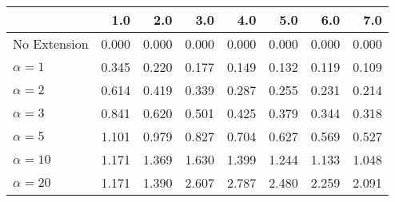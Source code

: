 \begin{tabular}{lrrrrrrr}
\toprule
{} &   1.0 &   2.0 &   3.0 &   4.0 &   5.0 &   6.0 &   7.0 \\
\midrule
No Extension  & 0.000 & 0.000 & 0.000 & 0.000 & 0.000 & 0.000 & 0.000 \\
$\alpha = 1$  & 0.345 & 0.220 & 0.177 & 0.149 & 0.132 & 0.119 & 0.109 \\
$\alpha = 2$  & 0.614 & 0.419 & 0.339 & 0.287 & 0.255 & 0.231 & 0.214 \\
$\alpha = 3$  & 0.841 & 0.620 & 0.501 & 0.425 & 0.379 & 0.344 & 0.318 \\
$\alpha = 5$  & 1.101 & 0.979 & 0.827 & 0.704 & 0.627 & 0.569 & 0.527 \\
$\alpha = 10$ & 1.171 & 1.369 & 1.630 & 1.399 & 1.244 & 1.133 & 1.048 \\
$\alpha = 20$ & 1.171 & 1.390 & 2.607 & 2.787 & 2.480 & 2.259 & 2.091 \\
\bottomrule
\end{tabular}
